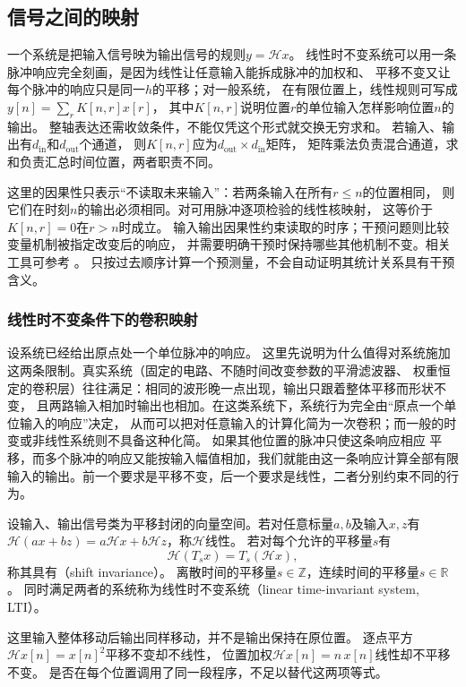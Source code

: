 \subsection{信号之间的映射}
\label{sec:signal-input-output-maps}
\label{sec:signal-analysis-discrete-filtering}

一个系统是把输入信号映为输出信号的规则$y=\mathcal Hx$。
线性时不变系统可以用一条脉冲响应完全刻画，是因为线性让任意输入能拆成脉冲的加权和、
平移不变又让每个脉冲的响应只是同一$h$的平移；对一般系统，
在有限位置上，线性规则可写成$y[n]=\sum_r K[n,r]x[r]$，
其中$K[n,r]$说明位置$r$的单位输入怎样影响位置$n$的输出。
整轴表达还需收敛条件，不能仅凭这个形式就交换无穷求和。
若输入、输出有$d_{\mathrm{in}}$和$d_{\mathrm{out}}$个通道，
则$K[n,r]$应为$d_{\mathrm{out}}\times d_{\mathrm{in}}$矩阵，
矩阵乘法负责混合通道，求和负责汇总时间位置，两者职责不同。

这里的因果性只表示“不读取未来输入”：若两条输入在所有$r\leq n$的位置相同，
则它们在时刻$n$的输出必须相同。对可用脉冲逐项检验的线性核映射，
这等价于$K[n,r]=0$在$r>n$时成立。
输入输出因果性约束读取的时序；干预问题则比较变量机制被指定改变后的响应，
并需要明确干预时保持哪些其他机制不变。相关工具可参考
。
只按过去顺序计算一个预测量，不会自动证明其统计关系具有干预含义。

\subsubsection{线性时不变条件下的卷积映射}
\label{sec:signal-analysis-lti-convolution}

设系统已经给出原点处一个单位脉冲的响应。
这里先说明为什么值得对系统施加这两条限制。真实系统（固定的电路、不随时间改变参数的平滑滤波器、
权重恒定的卷积层）往往满足：相同的波形晚一点出现，输出只跟着整体平移而形状不变，
且两路输入相加时输出也相加。在这类系统下，系统行为完全由“原点一个单位输入的响应”决定，
从而可以把对任意输入的计算化简为一次卷积；而一般的时变或非线性系统则不具备这种化简。
如果其他位置的脉冲只使这条响应相应
平移，而多个脉冲的响应又能按输入幅值相加，我们就能由这一条响应计算全部有限
输入的输出。前一个要求是平移不变，后一个要求是线性，二者分别约束不同的行为。
\begin{definition}[线性时不变系统]
  \label{def:signal-analysis-lti-system}
  设输入、输出信号类为平移封闭的向量空间。若对任意标量$a,b$及输入$x,z$有
  $\mathcal H(ax+bz)=a\mathcal Hx+b\mathcal Hz$，称$\mathcal H$线性。
  若对每个允许的平移量$s$有
  \[
    \mathcal H(T_sx)=T_s(\mathcal Hx),
  \]
  称其具有（shift invariance）。
  离散时间的平移量$s\in\mathbb Z$，连续时间的平移量$s\in\mathbb R$。
  同时满足两者的系统称为线性时不变系统（linear time-invariant system, LTI）。
\end{definition}
这里输入整体移动后输出同样移动，并不是输出保持在原位置。
逐点平方$\mathcal Hx[n]=x[n]^2$平移不变却不线性，
位置加权$\mathcal Hx[n]=n\,x[n]$线性却不平移不变。
是否在每个位置调用了同一段程序，不足以替代这两项等式。

